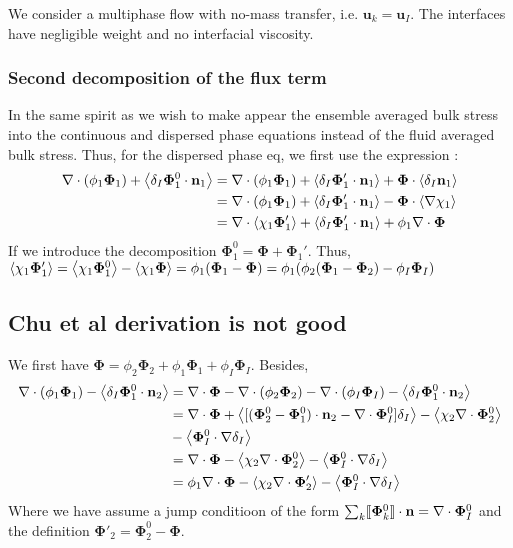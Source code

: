 
We consider a multiphase flow with no-mass transfer, i.e. $\textbf{u}_k=\textbf{u}_I$.
The interfaces have negligible weight and no interfacial viscosity. 



\subsubsection{Second decomposition of the flux term}
In the same spirit as \citet{chu2016flux} we wish to make appear the ensemble averaged bulk stress into the continuous and dispersed phase equations instead of the fluid averaged bulk stress. 
Thus, for the dispersed phase eq, we first use the expression :
\begin{align*}
    \mathbf{\nabla}\cdot  (\phi_1 \mathbf{\Phi}_1)
    + \left<\delta_I \mathbf{\Phi}_1^0 \cdot \textbf{n}_1\right>
    &=
    \mathbf{\nabla}\cdot  (\phi_1 \mathbf{\Phi}_1)
    + \left<\delta_I \mathbf{\Phi}_1' \cdot \textbf{n}_1\right>
    + \mathbf{\Phi} \cdot  \left<\delta_I \textbf{n}_1\right>\\
    &=
    \mathbf{\nabla}\cdot  (\phi_1 \mathbf{\Phi}_1)
    + \left<\delta_I \mathbf{\Phi}_1' \cdot \textbf{n}_1\right>
    - \mathbf{\Phi} \cdot  \left<\mathbf{\nabla}\chi_1\right>\\
    &=
    \mathbf{\nabla}\cdot  \left<\chi_1 \mathbf{\Phi}_1'\right>
    + \left<\delta_I \mathbf{\Phi}_1' \cdot \textbf{n}_1\right>
    + \phi_1 \mathbf{\nabla}\cdot \bm{\Phi}\\
\end{align*}
If we introduce the decomposition  $\mathbf{\Phi}_1^0 =  \mathbf{\Phi} + \mathbf{\Phi}_1'$.
Thus, $\left<\chi_1\mathbf{\Phi}_1'\right> 
= \left<\chi_1 \mathbf{\Phi}_1^0\right> - \left<\chi_1\mathbf{\Phi}\right>
= \phi_1 (\mathbf{\Phi}_1 - \mathbf{\Phi})
= \phi_1 ( \phi_2 (\mathbf{\Phi}_1  -  \mathbf{\Phi}_2)  - \phi_I \mathbf{\Phi}_I )$
\subsection{Chu et al derivation is not good}
We first have $\bm{\Phi} = \phi_2 \bm{\Phi}_2+\phi_1 \bm{\Phi}_1 + \phi_I \bm{\Phi}_I$. 
Besides,
\begin{align*}
    \mathbf{\nabla}\cdot  (\phi_1 \mathbf{\Phi}_1)
    - \left<\delta_I \mathbf{\Phi}_1^0 \cdot \textbf{n}_2\right>
    &=
    \mathbf{\nabla}\cdot  \mathbf{\Phi}
    - \mathbf{\nabla}\cdot  (\phi_2\mathbf{\Phi}_2)
    - \mathbf{\nabla}\cdot  (\phi_I\mathbf{\Phi}_I)
    - \left<\delta_I \mathbf{\Phi}_1^0 \cdot \textbf{n}_2\right>\\
    &=
    \mathbf{\nabla}\cdot  \mathbf{\Phi}
    + \left< [(\mathbf{\Phi}_2^0 - \mathbf{\Phi}_1^0) \cdot \textbf{n}_2 - \mathbf{\nabla}\cdot \mathbf{\Phi}_I^0]\delta_I\right>
    - \left< \chi_2 \mathbf{\nabla}\cdot \mathbf{\Phi}_2^0  \right>\\
    &- \left< \mathbf{\Phi}_I^0  \cdot \mathbf{\nabla}\delta_I\right>
    \\
    &=
    \mathbf{\nabla}\cdot  \mathbf{\Phi}
    - \left< \chi_2 \mathbf{\nabla}\cdot \mathbf{\Phi}_2^0  \right>
    - \left< \mathbf{\Phi}_I^0  \cdot \mathbf{\nabla}\delta_I\right>
    \\
    &=
    \phi_1 \mathbf{\nabla}\cdot  \mathbf{\Phi}
    - \left< \chi_2 \mathbf{\nabla}\cdot \mathbf{\Phi}_2'  \right>
    - \left< \mathbf{\Phi}_I^0  \cdot \mathbf{\nabla}\delta_I\right>
    \\
\end{align*}
Where we have assume a jump conditioon of the form $\sum_k \llbracket \mathbf{\Phi}_k^0 \rrbracket \cdot \textbf{n} = \nabla\cdot \bm{\Phi}_I^0$ and the definition $\bm{\Phi}'_2 = \bm{\Phi}_2^0 - \bm{\Phi}$.


